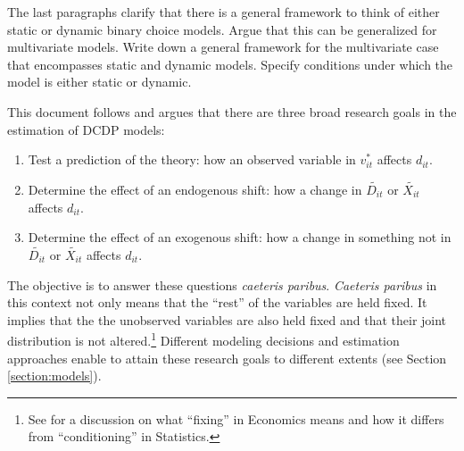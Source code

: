\begin{exercise}
The last paragraphs clarify that there is a general framework to think of either static or dynamic binary choice models. Argue that this can be generalized for multivariate models. Write down a general framework for the multivariate case that encompasses static and dynamic models. Specify conditions under which the model is either static or dynamic. 
\end{exercise}

\indent This document follows \citet{keane2011structural} and argues that there are three broad research goals in the estimation of DCDP models:
\begin{enumerate}
\item Test a prediction of the theory: how an observed variable in $v_{it}^*$ affects $d_{it}$.
\item Determine the effect of an endogenous shift: how a change in $\tilde{D_{it}}$ or $\tilde{X_{it}}$ affects $d_{it}$.
\item Determine the effect of an exogenous shift: how a change in something not in $\tilde{D_{it}}$ or $\tilde{X_{it}}$ affects $d_{it}$.
\end{enumerate}

\indent The objective is to answer these questions \emph{caeteris paribus}. \emph{Caeteris paribus} in this context not only means that the ``rest'' of the variables are held fixed. It implies that the the unobserved variables are also held fixed and that their joint distribution is not altered.\footnote{See \citet{heckman2013causal} for a discussion on what ``fixing'' in Economics means and how it differs from ``conditioning'' in Statistics.} Different modeling decisions and estimation approaches enable to attain these research goals to different extents (see Section \ref{section:models}).

 


 






